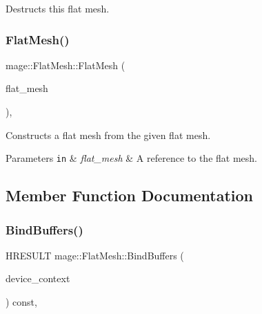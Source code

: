 Destructs this flat mesh. \hypertarget{classmage_1_1_flat_mesh_ac352a78256d4f04223f05f1535a35173}{}\label{classmage_1_1_flat_mesh_ac352a78256d4f04223f05f1535a35173} 
\subsubsection{\texorpdfstring{Flat\+Mesh()}{FlatMesh()}\hspace{0.1cm}{\footnotesize\ttfamily [2/2]}}
{\footnotesize\ttfamily mage\+::\+Flat\+Mesh\+::\+Flat\+Mesh (\begin{DoxyParamCaption}\item[{const \hyperlink{classmage_1_1_flat_mesh}{Flat\+Mesh} \&}]{flat\+\_\+mesh }\end{DoxyParamCaption})\hspace{0.3cm}{\ttfamily [private]}, {\ttfamily [delete]}}

Constructs a flat mesh from the given flat mesh.


\begin{DoxyParams}[1]{Parameters}
\mbox{\tt in}  & {\em flat\+\_\+mesh} & A reference to the flat mesh. \\
\hline
\end{DoxyParams}


\subsection{Member Function Documentation}
\hypertarget{classmage_1_1_flat_mesh_a3d7a8793a2b802aa51ae91517201af6d}{}\label{classmage_1_1_flat_mesh_a3d7a8793a2b802aa51ae91517201af6d} 
\subsubsection{\texorpdfstring{Bind\+Buffers()}{BindBuffers()}}
{\footnotesize\ttfamily H\+R\+E\+S\+U\+LT mage\+::\+Flat\+Mesh\+::\+Bind\+Buffers (\begin{DoxyParamCaption}\item[{\hyperlink{namespacemage_ae74f374780900893caa5555d1031fd79}{Com\+Ptr}$<$ I\+D3\+D11\+Device\+Context2 $>$}]{device\+\_\+context }\end{DoxyParamCaption}) const\hspace{0.3cm}{\ttfamily [override]}, {\ttfamily [virtual]}}



